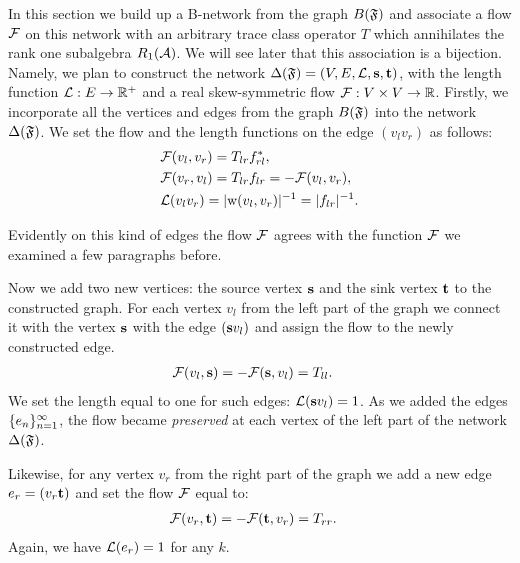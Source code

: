 \documentclass[12pt,oneside,a4paper]{amsart}
\begin{document}
      In this section we build up a B-network from the graph $B(\fsys)$ and associate a flow $\flow$ on this network with 
        an arbitrary trace class operator $T$ which annihilates the rank one subalgebra $R_1(\cal{A})$.
      We will see later that this association is a bijection.
      Namely, we plan to construct the network $\net(\fsys) = (V, E, \len, \source, \sink)$,
        with the length function $\len: E \to \mathbb{R}^{+}$ and a real skew-symmetric flow $\flow: V \times V \to \mathbb{R}$.
      Firstly, we incorporate all the vertices and edges from the graph $B(\fsys)$ into the network $\net(\fsys)$.
      We set the flow and the length functions on the edge $(v_l v_r)$ as follows:
      \begin{align*}
        &\flow(v_l, v_r) = T_{lr} f^*_{rl},\\
        &\flow(v_r, v_l) = T_{lr} f_{lr} = -\flow(v_l, v_r),\\
        &\len(v_l v_r) = \lvert \wt(v_l, v_r) \rvert^{-1} =  \lvert f_{lr}\rvert^{-1}.
      \end{align*}
      \begin{remark}
        Evidently on this kind of edges the flow $\flow$ agrees with the function $\flowsgn$
          we examined a few paragraphs before.
      \end{remark}

      Now we add two new vertices: the source vertex $\source$ and the sink vertex $\sink$ to the constructed graph.
      For each vertex $v_l$ from the left part of the graph we connect it with the vertex $\source$ with the edge $(\source v_l)$
        and assign the flow to the newly constructed edge.
      \begin{align*}
        &\flow(v_l, \source) = -\flow(\source, v_l) = T_{ll}.
      \end{align*}
      We set the length equal to one for such edges: $\len(\source v_l) = 1$.
      As we added the edges $\seq{e}$, the flow became \emph{preserved} at each vertex of the left part of the network $\net(\fsys)$.

      Likewise, for any vertex $v_r$ from the right part of the graph we add a new edge $e_r=(v_r \sink)$
        and set the flow $\flow$ equal to:
      \begin{align*}
        &\flow(v_r, \sink) = -\flow(\sink, v_r) =  T_{rr}.
      \end{align*}
      Again, we have $\len(e_r) = 1$ for any $k$.
\end{document}
